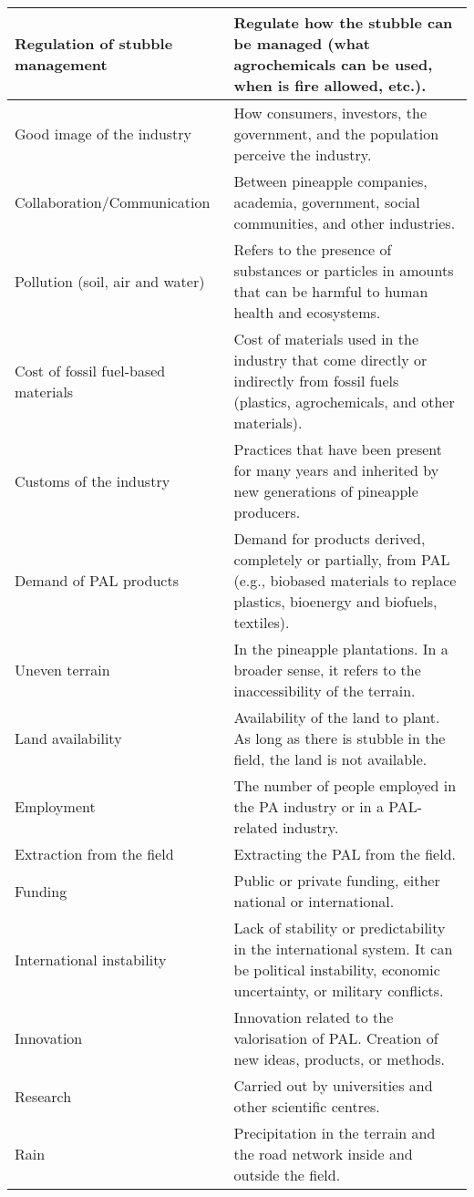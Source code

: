 \begin{appendices}
\begin{xltabular}{\textwidth}{XX}
Regulation of stubble management &
  Regulate how the stubble can be managed (what agrochemicals can be used,  when is fire allowed, etc.). \\ \hline
Good image of the industry &
  How consumers, investors, the government, and the population perceive the industry. \\ \hline
Collaboration/Communication &
  Between pineapple companies, academia, government, social communities, and other industries. \\ \hline
Pollution (soil, air and water) &
  Refers to the presence of substances or particles in amounts that can be harmful to human health and ecosystems. \\ \hline
Cost of fossil fuel-based materials &
  Cost of materials used in the industry that come directly or indirectly from fossil fuels (plastics, agrochemicals, and other materials). \\ \hline
Customs of the industry &
  Practices that have been present for many years and inherited by new generations of pineapple producers. \\ \hline
Demand of PAL products &
  Demand for products derived, completely or partially, from PAL (e.g., biobased materials to replace plastics, bioenergy and biofuels, textiles). \\ \hline
Uneven terrain &
  In the pineapple plantations. In a broader sense, it refers to the inaccessibility of the terrain. \\ \hline
Land availability &
  Availability of the land to plant. As long as there is stubble in the field, the land is not available. \\ \hline
Employment &
  The number of people employed in the PA industry or in a PAL-related industry. \\ \hline
Extraction from the field &
  Extracting the PAL from the field. \\ \hline
Funding &
  Public or private funding, either national or international. \\ \hline
International instability &
  Lack of stability or predictability in the international system. It can be political instability, economic uncertainty, or military conflicts. \\ \hline
Innovation &
  Innovation related to the valorisation of PAL. Creation of new ideas, products, or methods. \\ \hline
Research &
  Carried out by universities and other scientific centres. \\ \hline
Rain &
  Precipitation in the terrain and the road network inside and outside the field. \\ \hline

\end{xltabular}
\end{appendices}
